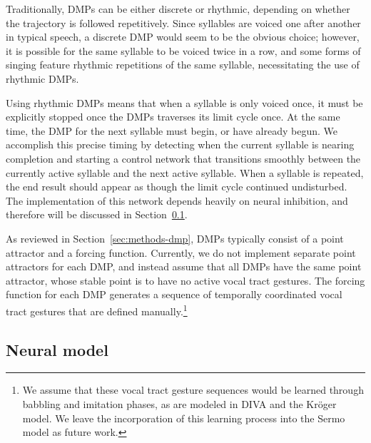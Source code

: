 Traditionally, DMPs can be either discrete or rhythmic,
depending on whether the trajectory
is followed repetitively.
Since syllables are voiced
one after another in typical speech,
a discrete DMP would seem to be
the obvious choice;
however, it is possible for
the same syllable to be voiced
twice in a row,
and some forms of singing
feature rhythmic repetitions
of the same syllable,
necessitating the use of rhythmic DMPs.

Using rhythmic DMPs
means that when a syllable
is only voiced once,
it must be explicitly stopped
once the DMPs traverses
its limit cycle once.
At the same time,
the DMP for the next syllable must begin,
or have already begun.
We accomplish this precise timing
by detecting when the current syllable
is nearing completion
and starting a control network
that transitions smoothly
between the currently active syllable
and the next active syllable.
When a syllable is repeated,
the end result should appear as though
the limit cycle continued undisturbed.
The implementation of this network
depends heavily on neural inhibition,
and therefore will be discussed
in Section~\ref{sec:impl-prod-neuralmodel}.

As reviewed in Section~\ref{sec:methods-dmp},
DMPs typically consist of a point attractor
and a forcing function.
Currently, we do not implement
separate point attractors for each DMP,
and instead assume that all DMPs
have the same point attractor,
whose stable point is
to have no active vocal tract gestures.
The forcing function for each DMP
generates a sequence of temporally coordinated
vocal tract gestures
that are defined manually.\footnote{
  We assume that these vocal tract gesture sequences
  would be learned through babbling and imitation phases,
  as are modeled in DIVA and the Kr\"{o}ger model.
  We leave the incorporation of this learning process
  into the Sermo model as future work.}

\subsection{Neural model}
\label{sec:impl-prod-neuralmodel}


